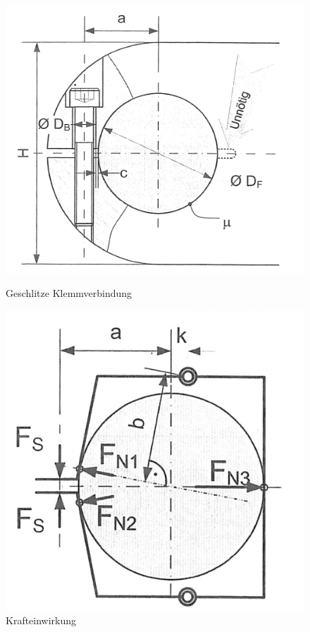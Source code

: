 \begin{figure}[H]
	\centering
	\begin{minipage}[b]{0.48\linewidth}
		\includegraphics[width=\linewidth]{kupplungen/geschlitzte-klemmverbindung}
		\caption*{Geschlitze Klemmverbindung}
	\end{minipage}
		\begin{minipage}[b]{0.48\linewidth}
		\includegraphics[width=\linewidth]{kupplungen/geschlitzte-klemmverbindung-frei}
		\caption*{Krafteinwirkung}
	\end{minipage}
\end{figure}
